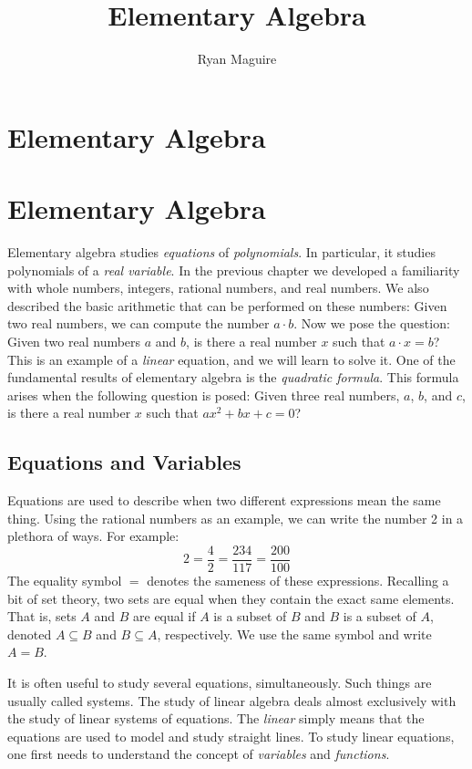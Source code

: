 \documentclass[crop=false,class=book,oneside]{standalone}                      %
\begin{document}
    \ifx\ifmain\undefined
        \title{Elementary Algebra}
        \author{Ryan Maguire}
        \date{\vspace{-5ex}}
        \maketitle
        \tableofcontents
        \setcounter{chapter}{1}
        \chapter{Elementary Algebra}
    \else
        \chapter{Elementary Algebra}
    \fi
    Elementary algebra studies \textit{equations} of
    \textit{polynomials}. In particular, it studies polynomials
    of a \textit{real variable}. In the previous chapter we
    developed a familiarity with whole numbers, integers,
    rational numbers, and real numbers. We also described the
    basic arithmetic that can be performed on these numbers:
    Given two real numbers, we can compute the number
    $a\cdot{b}$. Now we pose the question: Given two real numbers
    $a$ and $b$, is there a real number $x$ such that
    $a\cdot{x}=b$? This is an example of a \textit{linear}
    equation, and we will learn to solve it. One of the
    fundamental results of elementary algebra is the
    \textit{quadratic formula}. This formula arises when the
    following question is posed: Given three real numbers,
    $a$, $b$, and $c$, is there a real number $x$ such that
    $ax^{2}+bx+c=0$?
    \section{Equations and Variables}
        Equations are used to describe when two different expressions mean the
        same thing. Using the rational numbers as an example, we can write
        the number 2 in a plethora of ways. For example:
        \begin{equation}
            2=\frac{4}{2}=\frac{234}{117}=\frac{200}{100}
        \end{equation}
        The equality symbol $=$ denotes the sameness of these expressions.
        Recalling a bit of set theory, two sets are equal when they contain
        the exact same elements. That is, sets $A$ and $B$ are equal if
        $A$ is a subset of $B$ and $B$ is a subset of $A$, denoted
        $A\subseteq{B}$ and $B\subseteq{A}$, respectively. We use the same
        symbol and write $A=B$.
        \par\hfill\par
        It is often useful to study several equations, simultaneously. Such
        things are usually called systems. The study of linear algebra deals
        almost exclusively with the study of linear systems of equations. The
        \textit{linear} simply means that the equations are used to model and
        study straight lines. To study linear equations, one first needs to
        understand the concept of \textit{variables} and \textit{functions}.
\end{document}
